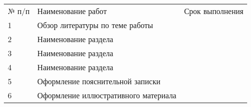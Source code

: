 
\begin{center}

	\vspace*{1.5cm}

	\confirmation

	\vspace*{1.5cm}
	
	\worktitle

	\vspace*{1cm}
	
	\begin{tabularx}{\textwidth}{ l X l }
		№ п/п & Наименование работ & Срок выполнения \\
		1 & Обзор литературы по теме работы & \\
		2 & Наименование раздела & \\
		3 & Наименование раздела & \\
		4 & Наименование раздела & \\
		5 & Оформление пояснительной записки & \\
		6 & Оформление иллюстративного материала & \\
	\end{tabularx}

	\vspace*{4cm}

	\subsblock
\end{center}
